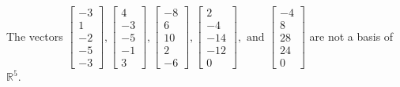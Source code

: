 \begin{exercise}
\begin{exerciseStatement}
  \end{exerciseStatement}
  \begin{exerciseAnswer}
   The vectors \(\left[\begin{array}{r}
-3 \\
1 \\
-2 \\
-5 \\
-3
\end{array}\right] , \left[\begin{array}{r}
4 \\
-3 \\
-5 \\
-1 \\
3
\end{array}\right] , \left[\begin{array}{r}
-8 \\
6 \\
10 \\
2 \\
-6
\end{array}\right] , \left[\begin{array}{r}
2 \\
-4 \\
-14 \\
-12 \\
0
\end{array}\right] , \text{ and } \left[\begin{array}{r}
-4 \\
8 \\
28 \\
24 \\
0
\end{array}\right]\) 
  	 are not  a basis of \(\mathbb{R}^5\).
  


  \end{exerciseAnswer}
\end{exercise}